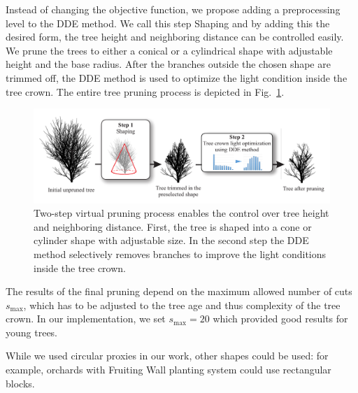 Instead of changing the objective function, we propose adding a
preprocessing level to the DDE method. We call this step Shaping  and
by adding this the desired form, the tree height and neighboring
distance can be controlled easily. We prune the trees to either a conical or a cylindrical shape
with adjustable height and the base radius. After
the branches outside the chosen shape are trimmed off, the DDE method is
used to optimize the light condition inside the tree crown. The entire
tree pruning process is depicted in Fig.~\ref{fig:my_figure3}.
\begin{figure}[hbt]
    \centering
    \includegraphics[width=5.3in]{figs/Fig4.pdf}
    \caption{Two-step virtual pruning process enables the control
over tree height and neighboring distance. First, the tree is shaped
into a cone or cylinder shape with adjustable size. In the second step
the DDE method selectively removes branches to improve the light
conditions inside the tree crown.}
    \label{fig:my_figure3}
\end{figure}

The results of the final pruning depend on the maximum
allowed number of cuts \(s_{\mathrm{\max}}\), which has to be adjusted
to the tree age and thus complexity of the tree crown. In our implementation,
we set \(s_{\mathrm{\max}} = 20\) which provided good results for young
trees. 

While we used circular proxies in our work, other shapes could be
used: for example, orchards with Fruiting Wall planting system could use
rectangular blocks.
